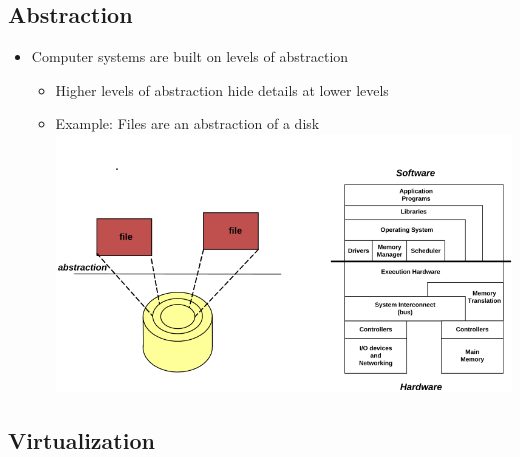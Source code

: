 \documentclass{scrartcl}
\begin{document}
\subsection{Abstraction}

\begin{itemize}
	\item Computer systems are built on levels of abstraction
	\begin{itemize}
		\item Higher levels of abstraction hide details at lower levels
		\item Example: Files are an abstraction of a disk \\
		
		\includegraphics[width=.8\textwidth]{figures/Abstraction.png}
	\end{itemize}
\end{itemize}

\subsection{Virtualization}
\end{document}
